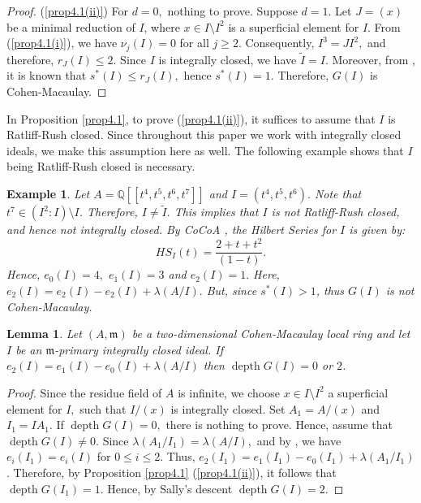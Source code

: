 \documentclass[11pt]{amsart}
\theoremstyle{plain}
\newtheorem{lemma}[theorem]{Lemma}
\newtheorem{example}[theorem]{Example}
\newcommand{\m}{\mathfrak{m}}
\newcommand{\wt}{\widetilde}
\newcommand{\depth}{\operatorname{depth}}
\theoremstyle{plain}
\begin{document}
\begin{proof}
\noindent
(\ref{prop4.1(ii)}) For $d=0,$ nothing to prove. Suppose $d=1.$ %
Let $J=(x)$ be a minimal reduction of $I$, where $x \in I\setminus I^2$ is a superficial element for $I$. From (\ref{prop4.1(i)}), we have $\nu_{j}(I)=0$ for all $j\geq 2$. Consequently, $I^3=JI^2,$ and therefore, $r_{J}(I)\leq 2.$ Since $I$ is integrally closed, we have $\widetilde{I}=I.$ Moreover, from \cite[Proposition 4.2$(i)$]{MR2013172}, it is known that $s^{*}(I) \leq r_{J}(I),$ hence $s^{*}(I)=1.$ Therefore, $G(I)$ is Cohen-Macaulay. 
\end{proof}

 In Proposition \ref{prop4.1}, to prove (\ref{prop4.1(ii)}), it suffices to assume that $I$ is Ratliff-Rush closed. Since throughout this paper we work with integrally closed ideals, we make this assumption here as well.
The following example shows that $I$ being Ratliff-Rush closed is necessary.
\begin{example} \cite[Example 1.4.2]{rossi2010hilbert} \normalfont Let $A=\mathbb{Q}[[t^4,t^5,t^6,t^7]]$ and  $I=(t^4,t^5,t^6).$ Note that  $t^7\in (I^2:I)\setminus I$. Therefore, $I\neq \wt{I}.$  This implies that $I$ is not Ratliff-Rush closed, and hence not integrally closed. 
By CoCoA \cite{cocoa}, the Hilbert Series for $I$ is given by:
\begin{equation*}
    HS_{I}(t)=\dfrac{2+t+t^2}{(1-t)}.
\end{equation*}
Hence, $e_{0}(I)=4,$ $e_{1}(I)=3$ and $e_{2}(I)=1.$ Here,  $e_{2}(I)=e_{2}(I)-e_{2}(I)+\lambda(A/I).$ But, since $s^{*}(I)>1$, thus $G(I)$ is not Cohen-Macaulay. 
\end{example}



\begin{lemma} \label{lemma4.4}
    Let $(A,\m)$ be a two-dimensional Cohen-Macaulay local ring and let $I$ be an $\m$-primary integrally closed ideal. If $e_{2}(I)=e_{1}(I)-e_{0}(I)+\lambda(A/I)$  then $\depth G(I)=0$ or $2$.
\end{lemma}

\begin{proof}
     Since the residue field of $A$ is infinite, we  choose $x \in I\setminus I^2$ a superficial element for $I,$ such that $I/(x)$ is integrally closed. Set $A_1=A/(x)$ and $I_1=IA_1.$ If $\depth G(I)=0,$ there is nothing to prove. Hence, assume that  $\operatorname{depth}G(I) \neq 0.$ Since $\lambda(A_1/I_1)=\lambda(A/I),$ and  by \cite[Proposition 1.2]{rossi2010hilbert}, we have $e_{i}(I_1)=e_{i}(I)$ for $0\leq i\leq2.$ Thus, $e_{2}(I_1)=e_{1}(I_1)-e_{0}(I_1)+\lambda(A_1/I_1)$.  Therefore, by Proposition \ref{prop4.1} (\ref{prop4.1(ii)}), it follows that $\operatorname{depth}G(I_1)=1.$ Hence, by Sally's descent $\operatorname{depth}G(I)=2.$
\end{proof}
\end{document}
